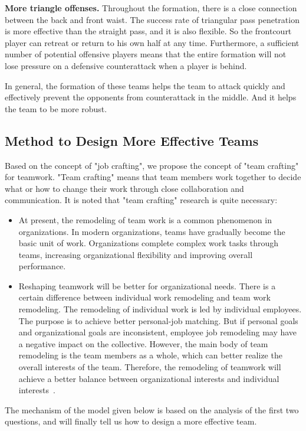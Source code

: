 \documentclass{mcmthesis}
\begin{document}
\textbf{More triangle offenses.} Throughout the formation, there is a close connection between the back and front waist. The success rate of triangular pass penetration is more effective than the straight pass, and it is also flexible. So the frontcourt player can retreat or return to his own half at any time. Furthermore, a sufficient number of potential offensive players means that the entire formation will not lose pressure on a defensive counterattack when a player is behind.
\par
In general, the formation of these teams helps the team to attack quickly and effectively prevent the opponents from counterattack in the middle. And it helps the team to be more robust.

\subsection{Method to Design More Effective Teams}
	Based on the concept of "job crafting", we propose the concept of "team crafting" for teamwork.  "Team crafting" means that team members work together to decide what or how to change their work through close collaboration and communication.  It is noted that "team crafting" research is quite necessary:
	\begin{itemize}
		\item At present, the remodeling of team work is a common phenomenon in organizations. In modern organizations, teams have gradually become the basic unit of work.  Organizations complete complex work tasks through teams, increasing organizational flexibility and improving overall performance.
		\item Reshaping teamwork will be better for organizational needs.  There is a certain difference between individual work remodeling and team work remodeling. The remodeling of individual work is led by individual employees. The purpose is to achieve better personal-job matching.  But if personal goals and organizational goals are inconsistent, employee job remodeling may have a negative impact on the collective. However, the main body of team remodeling is the team members as a whole, which can better realize the overall interests of the team.  Therefore, the remodeling of teamwork will achieve a better balance between organizational interests and individual interests~\cite{3}.
	\end{itemize}

	The mechanism of the model given below is based on the analysis of the first two questions, and will finally tell us how to design a more effective team.
\end{document}
